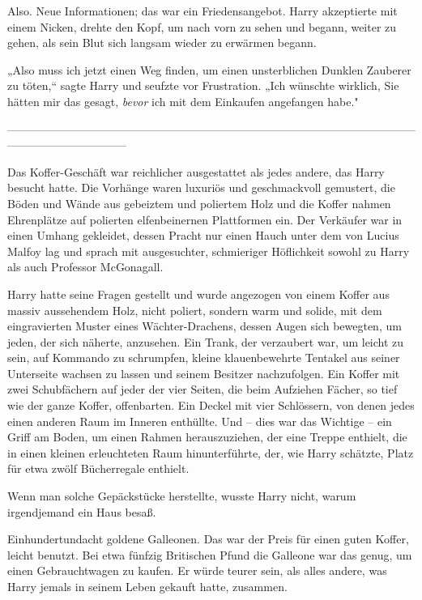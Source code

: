 {Also. Neue Informationen; das war ein Friedensangebot. Harry akzeptierte mit einem Nicken, drehte den Kopf, um nach vorn zu sehen und begann, weiter zu gehen, als sein Blut sich langsam wieder zu erwärmen begann.

„Also muss ich jetzt einen Weg finden, um einen unsterblichen Dunklen Zauberer zu töten,“ sagte Harry und seufzte vor Frustration. „Ich wünschte wirklich, Sie hätten mir das gesagt, \emph{bevor} ich mit dem Einkaufen angefangen habe."

--------------------------------------------------------------------------------------------------------------------------------------------

\hfill\break Das Koffer-Geschäft war reichlicher ausgestattet als jedes andere, das Harry besucht hatte. Die Vorhänge waren luxuriös und geschmackvoll gemustert, die Böden und Wände aus gebeiztem und poliertem Holz und die Koffer nahmen Ehrenplätze auf polierten elfenbeinernen Plattformen ein. Der Verkäufer war in einen Umhang gekleidet, dessen Pracht nur einen Hauch unter dem von Lucius Malfoy lag und sprach mit ausgesuchter, schmieriger Höflichkeit sowohl zu Harry als auch Professor McGonagall.

Harry hatte seine Fragen gestellt und wurde angezogen von einem Koffer aus massiv aussehendem Holz, nicht poliert, sondern warm und solide, mit dem eingravierten Muster eines Wächter-Drachens, dessen Augen sich bewegten, um jeden, der sich näherte, anzusehen. Ein Trank, der verzaubert war, um leicht zu sein, auf Kommando zu schrumpfen, kleine klauenbewehrte Tentakel aus seiner Unterseite wachsen zu lassen und seinem Besitzer nachzufolgen. Ein Koffer mit zwei Schubfächern auf jeder der vier Seiten, die beim Aufziehen Fächer, so tief wie der ganze Koffer, offenbarten. Ein Deckel mit vier Schlössern, von denen jedes einen anderen Raum im Inneren enthüllte. Und -- dies war das Wichtige -- ein Griff am Boden, um einen Rahmen herauszuziehen, der eine Treppe enthielt, die in einen kleinen erleuchteten Raum hinunterführte, der, wie Harry schätzte, Platz für etwa zwölf Bücherregale enthielt.

Wenn man solche Gepäckstücke herstellte, wusste Harry nicht, warum irgendjemand ein Haus besaß.

Einhundertundacht goldene Galleonen. Das war der Preis für einen guten Koffer, leicht benutzt. Bei etwa fünfzig Britischen Pfund die Galleone war das genug, um einen Gebrauchtwagen zu kaufen. Er würde teurer sein, als alles andere, was Harry jemals in seinem Leben gekauft hatte, zusammen.

}
